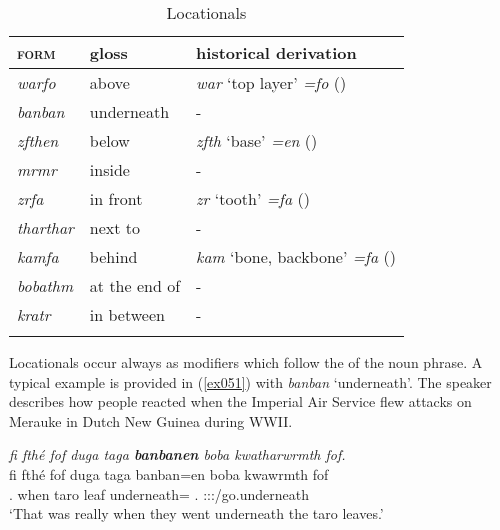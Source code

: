 \begin{table}
\caption{Locationals}
\label{locationaltable}
	\begin{tabular}{lll}
		\lsptoprule
		\textsc{form}&{gloss}&{historical derivation}\\ \midrule
		\emph{warfo}&above&\emph{war} `top layer' \emph{=fo} (\All{})\\
		\emph{banban}&underneath&-\\
		\emph{zfthen}&below&\emph{zfth} `base' \emph{=en} (\Loc{})\\
		\emph{mrmr}&inside&-\\
		\emph{zrfa}&in front&\emph{zr} `tooth' \emph{=fa} (\Abl{})\\
		\emph{tharthar}&next to&-\\
		\emph{kamfa}&behind&\emph{kam} `bone, backbone' \emph{=fa} (\Abl{})\\
		\emph{bobathm}&at the end of&-\\
		\emph{kratr}&in between&-\\
		\lspbottomrule
	\end{tabular}
\end{table}%

Locationals occur always as modifiers which follow the  of the noun phrase. A typical example is provided in (\ref{ex051}) with \emph{banban} `underneath'. The speaker describes how people reacted when the Imperial  Air Service flew attacks on Merauke in Dutch New Guinea during WWII.%

\begin{exe}
	\ex \emph{fi fthé fof duga taga \textbf{banbanen} boba kwatharwrmth fof.}\\
	\gll fi fthé fof duga taga banban=en boba kwawrmth fof\\
	\Tsg.\Abs{} when \Emph{} taro leaf underneath=\Loc{} \Med.\Abl{} \Stpl:\Sbj:\Pst:\Dur/go.underneath \Emph{}\\
	\trans `That was really when they went underneath the taro leaves.'\\
	\label{ex051}
\end{exe}

